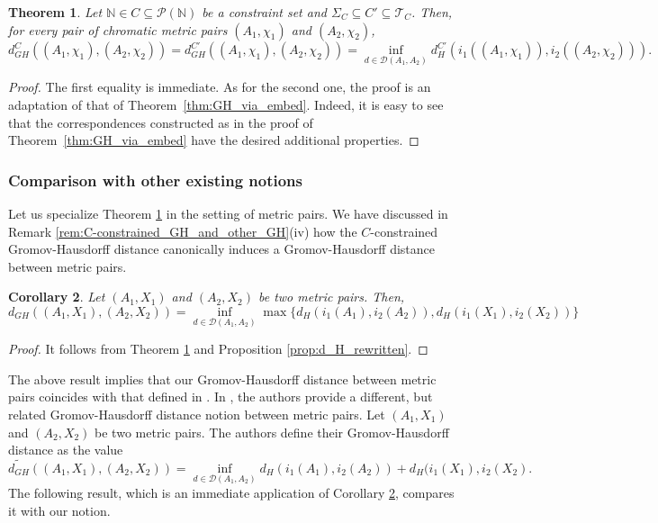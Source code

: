 \documentclass[8pt,a4paper,oneside,english,english]{article}
\theoremstyle{plain}
\theoremstyle
{plain}
\newtheorem{theorem}{Theorem}[section]
\newtheorem{corollary}[theorem]{Corollary}%
\theoremstyle{definition}
\newcommand{\N}{\mathbb{N}}
\newcommand{\Tau}{\mathcal T}
\newcommand{\GH}{d_{GH}}
\newcommand{\MP}[1]{(A_{#1},\chi_{#1})}
\begin{document}
\begin{theorem}\label{thm:C-GH_via_embeddings}
	Let $\N\in C\subseteq\mathcal P(\N)$ be a constraint set and $\Sigma_C\subseteq C'\subseteq\Tau_C$. Then, for every pair of chromatic metric pairs $\MP{1}$ and $\MP{2}$,
    \[
    \GH^C(\MP{1},\MP{2})=\GH^{C'}(\MP{1},\MP{2})=\inf_{d\in\mathcal D(A_1,A_2)}d_H^{C'}(i_1(\MP{1}),i_2(\MP{2})).
    \]
\end{theorem}
\begin{proof}
    The first equality is immediate. As for the second one, the proof is an adaptation of that of Theorem~\ref{thm:GH_via_embed}. Indeed, it is easy to see that the correspondences constructed as in the proof of Theorem~\ref{thm:GH_via_embed} have the desired additional properties.
\end{proof}

\subsubsection{Comparison with other existing notions}\label{subsub:related_notions}

Let us specialize Theorem \ref{thm:C-GH_via_embeddings} in the setting of metric pairs. We have discussed in Remark \ref{rem:C-constrained_GH_and_other_GH}(iv) how the $C$-constrained Gromov-Hausdorff distance canonically induces a Gromov-Hausdorff distance between metric pairs.

\begin{corollary}\label{coro:GH_metric_pairs}
    Let $(A_1,X_1)$ and $(A_2,X_2)$ be two metric pairs. Then,
    \[
    \GH((A_1,X_1),(A_2,X_2))=\inf_{d\in\mathcal{D}(A_1,A_2)}\max\{d_H(i_1(A_1),i_2(A_2)),d_H(i_1(X_1),i_2(X_2))\}
    \]
\end{corollary}
\begin{proof}
    It follows from Theorem \ref{thm:C-GH_via_embeddings} and Proposition \ref{prop:d_H_rewritten}.
\end{proof}

The above result implies that our Gromov-Hausdorff distance between metric pairs coincides with that defined in \cite{TorGon}. In \cite{GomChe}, the authors provide a different, but related Gromov-Hausdorff distance notion between metric pairs. Let $(A_1,X_1)$ and $(A_2,X_2)$ be two metric pairs. The authors define their Gromov-Hausdorff distance as the value
\[
    \widetilde{\GH}((A_1,X_1),(A_2,X_2))=\inf_{d\in\mathcal D(A_1,A_2)
    }d_H(i_1(A_1),i_2(A_2))+d_H(i_1(X_1),i_2(X_2).
\]
The following result, which is an immediate application of Corollary \ref{coro:GH_metric_pairs}, compares it with our notion.
\end{document}
